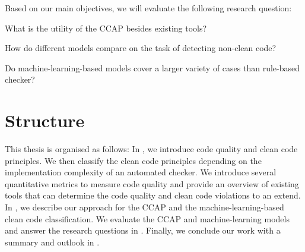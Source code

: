 Based on our main objectives, we will evaluate the following research question:
\begin{description}
    \setlength{\itemsep}{1pt}
    \item[RQ1]What is the utility of the CCAP besides existing tools? 
    \item[RQ2]How do different models compare on the task of detecting non-clean code?
    \item[RQ3]Do machine-learning-based models cover a larger variety of cases than rule-based checker? 
\end{description}


\section{Structure}
This thesis is organised as follows: In , we introduce code quality and clean code principles. We then classify the clean code principles depending on the implementation complexity of an automated checker. We introduce several quantitative metrics to measure code quality and provide an overview of existing tools that can determine the code quality and clean code violations to an extend. 
In , we describe our approach for the CCAP and the machine-learning-based clean code classification. We evaluate the CCAP and machine-learning models and answer the research questions in . Finally, we conclude our work with a summary and outlook in .